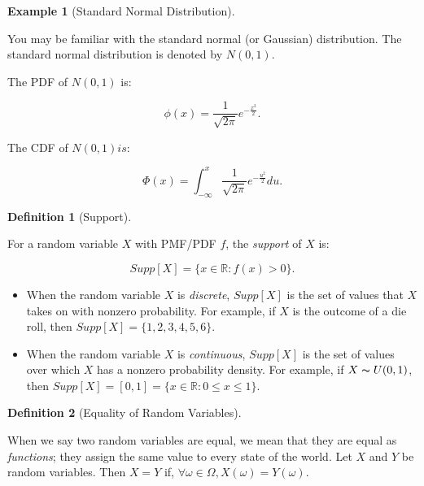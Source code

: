 \documentclass[
]{article}
\providecommand{\tightlist}{%
  \setlength{\itemsep}{0pt}\setlength{\parskip}{0pt}}
\theoremstyle{definition}
\newtheorem{definition}{Definition}[section]
\theoremstyle{definition}
\newtheorem{example}{Example}[section]
\theoremstyle{definition}
\theoremstyle{remark}
\begin{document}
\begin{example}[Standard Normal Distribution]
\protect\hypertarget{exm:unlabeled-div-36}{}\label{exm:unlabeled-div-36}

You may be familiar with the standard normal (or Gaussian) distribution. The standard normal distribution is denoted by \(N(0,1)\).

The PDF of \(N(0,1)\) is:

\[\phi(x) = \frac{1}{\sqrt{2\pi}}e^{-\frac{x^2}{2}}.\]

The CDF of \(N(0,1) is\):

\[\Phi(x) = \int_{-\infty}^x \frac{1}{\sqrt{2\pi}}e^{-\frac{u^2}{2}}du.\]

\end{example}

\begin{definition}[Support]
\protect\hypertarget{def:unlabeled-div-37}{}\label{def:unlabeled-div-37}

For a random variable \(X\) with PMF/PDF \(f\), the \emph{support} of \(X\) is:

\[Supp[X] = \{x \in \mathbb{R} : f(x) > 0\}.\]

\begin{itemize}
\tightlist
\item
  When the random variable \(X\) is \emph{discrete}, \(Supp[X]\) is the set of values that \(X\) takes on with nonzero probability. For example, if \(X\) is the outcome of a die roll, then \(Supp[X] = \{1,2,3,4,5,6\}\).
\item
  When the random variable \(X\) is \emph{continuous}, \(Supp[X]\) is the set of values over which \(X\) has a nonzero probability density. For example, if \(X \thicksim U(0,1)\), then \(Supp[X] = [0,1] = \{x \in \mathbb{R} : 0 \leq x \leq 1\}\).
\end{itemize}

\end{definition}

\begin{definition}[Equality of Random Variables]
\protect\hypertarget{def:unlabeled-div-38}{}\label{def:unlabeled-div-38}

When we say two random variables are equal, we mean that they are equal as \emph{functions}; they assign the same value to every state of the world. Let \(X\) and \(Y\) be random variables. Then \(X = Y\) if, \(\forall \omega \in \Omega, X(\omega) = Y(\omega)\).

\end{definition}
\end{document}
